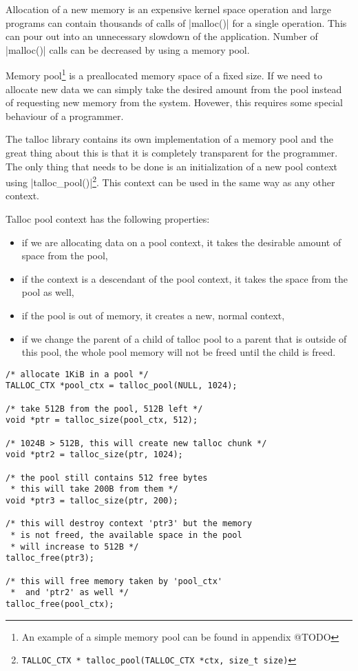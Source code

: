 
Allocation of a new memory is an expensive kernel space operation and large
programs can contain thousands of calls of |malloc()| for a single operation.
This can pour out into an unnecessary slowdown of the application. Number of
|malloc()| calls can be decreased by using a memory pool.

Memory pool\footnote{An example of a simple memory pool can be found in appendix
@TODO} is a preallocated memory space of a fixed size. If we need to allocate
new data we can simply take the desired amount from the pool instead of
requesting new memory from the system. Hovewer, this requires some special
behaviour of a programmer.

The talloc library contains its own implementation of a memory pool and the
great thing about this is that it is completely transparent for the programmer.
The only thing that needs to be done is an initialization of a new pool context
using |talloc_pool()|\footnote{\lstinline{TALLOC_CTX *
talloc_pool(TALLOC_CTX *ctx, size_t size)}}. This context can be used in the
same way as any other context.

Talloc pool context has the following properties:

\begin{itemize}
  \item if we are allocating data on a pool context, it takes the desirable
  amount of space from the pool,
  \item if the context is a descendant of the pool context, it takes the space
  from the pool as well,
  \item if the pool is out of memory, it creates a new, normal context,
  \item if we change the parent of a child of talloc pool to a parent that is
  outside of this pool, the whole pool memory will not be freed until the child
  is freed.
\end{itemize}

\begin{lstlisting}[caption={Talloc pool},label=lst:talloc_pool]
/* allocate 1KiB in a pool */
TALLOC_CTX *pool_ctx = talloc_pool(NULL, 1024);

/* take 512B from the pool, 512B left */
void *ptr = talloc_size(pool_ctx, 512);

/* 1024B > 512B, this will create new talloc chunk */
void *ptr2 = talloc_size(ptr, 1024);

/* the pool still contains 512 free bytes
 * this will take 200B from them */
void *ptr3 = talloc_size(ptr, 200);

/* this will destroy context 'ptr3' but the memory
 * is not freed, the available space in the pool
 * will increase to 512B */
talloc_free(ptr3);

/* this will free memory taken by 'pool_ctx'
 *  and 'ptr2' as well */
talloc_free(pool_ctx);
\end{lstlisting}

